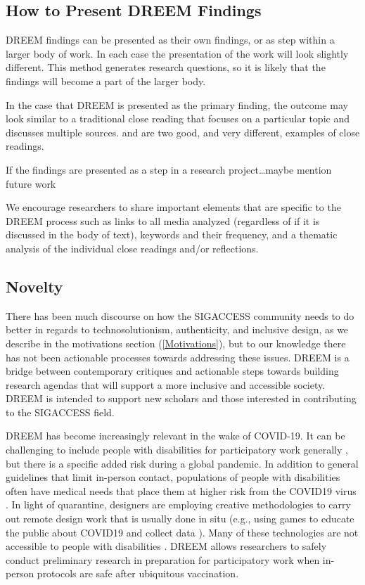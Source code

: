 \subsection{How to Present DREEM Findings}
DREEM findings can be presented as their own findings, or as step within a larger body of work. In each case the presentation of the work will look slightly different. This method generates research questions, so it is likely that the findings will become a part of the larger body. 

In the case that DREEM is presented as the primary finding, the outcome may look similar to a traditional close reading that focuses on a particular topic and discusses multiple sources. \cite{cullenBetterWorldExamples} and \cite{mingusReflectingFridaKahlo2010} are two good, and very different, examples of close readings. 

If the findings are presented as a step in a research project{\color{red}\ldots maybe mention future work}

We encourage researchers to share important elements that are specific to the DREEM process such as links to all media analyzed (regardless of if it is discussed in the body of text), keywords and their frequency, and a thematic analysis of the individual close readings and/or reflections. 

\subsection{Novelty}
There has been much discourse on how the SIGACCESS community needs to do better in regards to technosolutionism, authenticity, and inclusive design, as we describe in the motivations section (\ref{Motivations}), but to our knowledge there has not been actionable processes towards addressing these issues. DREEM is a bridge between contemporary critiques and actionable steps towards building research agendas that will support a more inclusive and accessible society. DREEM is intended to support new scholars and those interested in contributing to the SIGACCESS field. 

DREEM has become increasingly relevant in the wake of COVID-19. It can be challenging to include people with disabilities for participatory work generally \cite{wardReflectionsParticipatoryAction2001}, but there is a specific added risk during a global pandemic. In addition to general guidelines that limit in-person contact, populations of people with disabilities often have medical needs that place them at higher risk from the COVID19 virus \cite{armitageCOVID19ResponseMust2020}. In light of quarantine, designers are employing creative methodologies to carry out remote design work that is usually done in situ \cite{whiteLearningCOVID19Design2020} (e.g., using games to educate the public about COVID19 and collect data \cite{lopezherna;ndezHealthcareGamificationSerious2020}). Many of these technologies are not accessible to people with disabilities \cite{annaswamyTelemedicineBarriersChallenges2020}. DREEM allows researchers to safely conduct preliminary research in preparation for participatory work when in-person protocols are safe after ubiquitous vaccination. 

